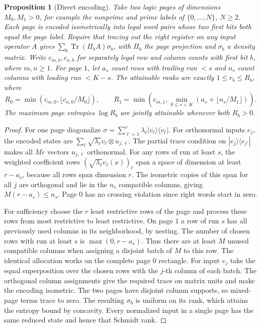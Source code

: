 \documentclass[11pt,reqno]{amsart}
\newtheorem{proposition}[theorem]{Proposition}
\theoremstyle{definition}
\theoremstyle{remark}
\numberwithin{equation}{section}
\begin{document}
\begin{proposition}[Direct encoding]\label{m9:encoder}
Take two logic pages of dimensions \(M_0,M_1>0\), for
example the nonprime and prime labels of \(\{0,\ldots,N\}\),
\(N\ge2\). Each page is encoded isometrically into legal word
pairs whose two first bits both equal the page label. Require that
tracing out the right register on any input operator \(A\)
gives \(\sum_b\operatorname{Tr}(\Pi_b A)\sigma_b\), with
\(\Pi_b\) the page projection and \(\sigma_b\) a density matrix.
Write \(c_{m,b},c_{n,b}\) for separately legal row and column
counts with first bit \(b\), where \(m,n\ge1\).
For page \(1\), let \(a_s\) count rows with trailing run \(<s\)
and \(n_s\) count columns with leading run \(<K-s\).
The attainable ranks are exactly \(1\le r_b\le R_b\), where
\[
 R_0=\min(c_{m,0},\lfloor c_{n,0}/M_0\rfloor),\qquad
 R_1=\min\left(c_{m,1},\min_{0\le s<K}
                       (a_s+\lfloor n_s/M_1\rfloor)\right).
\]
The maximum page entropies \(\log R_b\) are jointly attainable
whenever both \(R_b>0\).
\end{proposition}
\begin{proof}
For one page diagonalize \(\sigma=\sum_{\ell=1}^r
\lambda_\ell |v_\ell\rangle\langle v_\ell|\).
For orthonormal inputs \(e_j\), the encoded states are
\(\sum_\ell \sqrt{\lambda_\ell}v_\ell\otimes u_{j,\ell}\).
The partial trace condition on \(|e_j\rangle\langle e_{j'}|\)
makes all \(Mr\) vectors \(u_{j,\ell}\) orthonormal.
For any rows of run at least \(s\), the weighted coefficient
rows \((\sqrt{\lambda_\ell}v_\ell(x))_\ell\) span a space
of dimension at least \(r-a_s\), because all rows span
dimension \(r\). The isometric copies of this span for all
\(j\) are orthogonal and lie in the \(n_s\) compatible
columns, giving \(M(r-a_s)\le n_s\). Page \(0\) has no
crossing violation since right words start in zero.

For sufficiency choose the \(r\) least restrictive rows of the page
and process these rows from most restrictive to least restrictive.
On page \(1\) a row of run \(s\) has all previously used columns
in its neighborhood, by nesting. The number of chosen rows
with run at least \(s\) is \(\max(0,r-a_s)\). Thus there
are at least \(M\) unused compatible columns when assigning
a disjoint batch of \(M\) to this row. The identical allocation
works on the complete page \(0\) rectangle. For input \(e_j\)
take the equal superposition over the chosen rows with the \(j\)-th
column of each batch. The orthogonal column assignments give
the required trace on matrix units and make the encoding
isometric. The two pages have disjoint column supports, so
mixed-page terms trace to zero. The resulting \(\sigma_b\)
is uniform on its rank, which attains the entropy bound by
concavity. Every normalized input in a single page has the
same reduced state and hence that Schmidt rank.
\end{proof}
\end{document}
